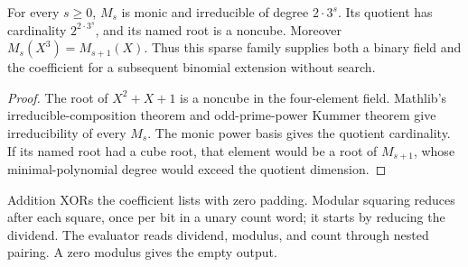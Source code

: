 \begin{theorem}
  \label{thm:lowerbounds-algebraic-binary-modulus}
  \leanok
  For every $s\ge0$, $M_s$ is monic and irreducible of degree
  $2\cdot3^s$. Its quotient has cardinality $2^{2\cdot3^s}$, and its
  named root is a noncube. Moreover $M_s(X^3)=M_{s+1}(X)$.
  Thus this sparse family supplies both a binary field and the
  coefficient for a subsequent binomial extension without search.
\end{theorem}
\begin{proof}
  \leanok
  The root of $X^2+X+1$ is a noncube in the four-element field.
  Mathlib's irreducible-composition theorem and odd-prime-power Kummer
  theorem give irreducibility of every $M_s$. The monic power basis
  gives the quotient cardinality. If its named root had a cube root,
  that element would be a root of $M_{s+1}$, whose minimal-polynomial
  degree would exceed the quotient dimension.
\end{proof}

\begin{definition}
  \label{def:lowerbounds-algebraic-bit-frobenius}
  \leanok
  Addition XORs the coefficient lists with zero padding. Modular
  squaring reduces after each square, once per bit in a unary count
  word; it starts by reducing the dividend. The evaluator reads
  dividend, modulus, and count through nested pairing. A zero modulus
  gives the empty output.
\end{definition}

